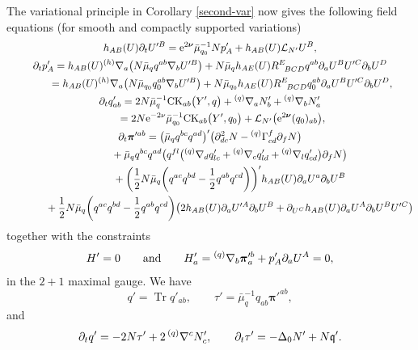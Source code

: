 \documentclass[pdftex]{sigma}
\def\ptl{\partial}%
\def\mbo#1{\boldsymbol{#1}}%
\def\grad{{\nabla}}%
\newcommand{\leftexp}[2]{{\vphantom{#2}}^{#1}{#2}}
\def\halb{\frac{1}{2}}%
\numberwithin{equation}{section}
\begin{document}
The variational principle in Corollary \ref{second-var} now gives the following field equations (for smooth and compactly supported variations)
\begin{gather*}
 h_{AB}(U) \ptl_t U'^B= {\rm e}^{2 \mbo{\nu}}\bar{\mu}^{-1}_{q_0} N p'_A + h_{AB}(U) \mathcal{L}_{N'} U^B, \\ %
\ptl_t p'_A = h_{AB} (U) \leftexp{(h)}{\grad}_a \bigl(N \bar{\mu}_{q} q^{ab} \grad_b U'^B\bigr) + N \bar{\mu}_q h_{AE}(U) R^E_{\,\,\,\,BCD} q^{a b} \ptl_a U^B U'^C \ptl_b U^D
\notag\\ \hphantom{\ptl_t p'_A }{}
=h_{AB} (U) \leftexp{(h)}{\grad}_a \bigl(N \bar{\mu}_{q_0} q_0^{ab} \grad_b U'^B\bigr)
+ N \bar{\mu}_{q_0} h_{AE}(U) R^E_{\,\,\,\,BCD} q_0^{a b} \ptl_a U^B U'^C \ptl_b U^D, \\ %
\ptl_t q'_{ab}= 2N \bar{\mu}^{-1}_{q} {\rm CK}_{ab}\bigl(Y', q\bigr)+ \leftexp{(q)}{\grad} _a N'_b + \leftexp{(q)}{\grad}_b N'_a \notag\\
\hphantom{\ptl_t q'_{ab}}{}
= 2N {\rm e}^{-2 \nu} \bar{\mu}^{-1}_{q_0} {\rm CK}_{ab}\bigl(Y', q_0\bigr)+ \mathcal{L}_{N'} \bigl({\rm e}^{ 2 \mbo{\nu}}(q_0)_{ab}\bigr), \\
\ptl_t \mbo{\pi}'^{ab} = \bigl(\bar{\mu}_q q^{bc} q^{ad}\bigr)' \bigl(\ptl^2_{dc} N - \leftexp{(q)}{\Gamma} ^f_{cd} \ptl_f N\bigr) \notag\\
\hphantom{\ptl_t \mbo{\pi}'^{ab} =}
+ \bar{\mu}_q q^{bc} q^{ad} \bigl(q^{fl} \bigl(\leftexp{(q)}{\grad} _d q'_{l c} + \leftexp{(q)}{\grad} _c q'_{l d}+\leftexp{(q)}{\grad} _l q'_{cd}\bigr) \ptl_f N\bigr) \notag\\
\hphantom{\ptl_t \mbo{\pi}'^{ab} =}
+ \biggl(\halb N \bar{\mu}_q \biggl(q^{ac} q^{bd} - \halb q^{ab} q^{cd}\biggr)\biggr)' h_{AB}(U) \ptl_a U^a \ptl_b U^B \notag\\
\hphantom{\ptl_t \mbo{\pi}'^{ab} =}
+ \halb N \bar{\mu}_q \biggl(q^{ac} q^{bd} - \halb q^{ab} q^{cd}\biggr) \bigl(2 h_{AB} (U) \ptl_a U'^A \ptl_b U^B + \ptl_{U^C} h_{AB} (U) \ptl_a U^A \ptl_b U^B U'^C\bigr)
\end{gather*}
together with the constraints
\begin{align*}
H'= 0 \qquad
\text{and}\qquad
H'_a= \leftexp{(q)}{\grad}_b \mbo{\pi}'^b_a + p'_A \ptl_a U^A= 0, %
\end{align*}
in the $2+1$ maximal gauge.
We have
\[
q'= \operatorname{Tr} q'_{ab}, \qquad \tau' = \bar{\mu}^{-1}_q q_{ab} \mbo{\pi}'^{ab},
\]
and
\[
\ptl_t q' = -2N \tau' + 2 \, \leftexp{(q)}{\grad}^c N'_c, \qquad \ptl_t \tau' = - \Delta_0 N' + N \mathfrak{q}'.
\]
\end{document}
